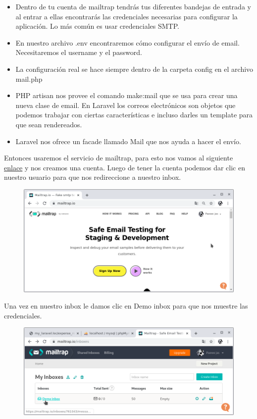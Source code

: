 \documentclass{article}
\begin{document}
\begin{itemize}
  \item Dentro de tu cuenta de mailtrap tendrás tus diferentes bandejas de
    entrada y al entrar a ellas encontrarás las credenciales necesarias para
    configurar la aplicación. Lo más común es usar credenciales SMTP.
  \item En nuestro archivo .env encontraremos cómo configurar el envío de
    email. Necesitaremos el username y el password.
  \item La configuración real se hace siempre dentro de la carpeta config en el
    archivo mail.php
  \item PHP artisan nos provee el comando make:mail que se usa para crear una
    nueva clase de email. En Laravel los correos electrónicos son objetos que
    podemos trabajar con ciertas características e incluso darles un template
    para que sean rendereados.
  \item Laravel nos ofrece un facade llamado Mail que nos ayuda a hacer el
    envío.
\end{itemize}

Entonces usaremos el servicio de mailtrap, para esto nos vamos al siguiente
\href{https://mailtrap.io/}{enlace} y nos creamos una cuenta. Luego de tener la
cuenta podemos dar clic en nuestro usuario para que nos redireccione a nuestro
inbox.

\begin{figure}[h!]
  \centering
  \includegraphics[scale=0.5]{./Pictures/124_mailtrapio_web.png}
\end{figure}

Una vez en nuestro inbox le damos clic en Demo inbox para que nos muestre las
credenciales.

\begin{figure}[h!]
  \centering
  \includegraphics[scale=0.5]{./Pictures/125_inbox.png}
\end{figure}
\end{document}
